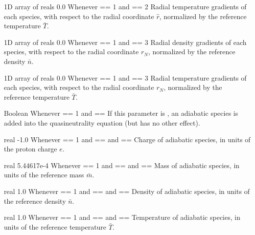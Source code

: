 \myhrule

{1D array of reals}
{0.0}
{Whenever  == 1 and  == 2}
{Radial temperature gradients of each species, with respect to the radial coordinate $\hat{r}$, normalized by the reference temperature $\bar{T}$.}

\myhrule

{1D array of reals}
{0.0}
{Whenever  == 1 and  == 3}
{Radial density gradients of each species, with respect to the radial coordinate $r_N$, normalized by the reference density $\bar{n}$.}

\myhrule

{1D array of reals}
{0.0}
{Whenever  == 1 and  == 3}
{Radial temperature gradients of each species, with respect to the radial coordinate $r_N$, normalized by the reference temperature $\bar{T}$.}

\myhrule

{Boolean}
{\false}
{Whenever  == 1 and  == \true}
{If this parameter is \true, an adiabatic species is added into the quasineutrality equation (but has no other effect).}

\myhrule

{real}
{-1.0}
{Whenever  == 1 and  == \true and  == \true}
{Charge of adiabatic species, in units of the proton charge $e$.}

\myhrule

{real}
{5.44617e-4}
{Whenever  == 1 and  == \true and  == \true}
{Mass of adiabatic species, in units of the reference mass $\bar{m}$.}

\myhrule

{real}
{1.0}
{Whenever  == 1 and  == \true and  == \true}
{Density of adiabatic species, in units of the reference density $\bar{n}$.}

\myhrule

{real}
{1.0}
{Whenever  == 1 and  == \true and  == \true}
{Temperature of adiabatic species, in units of the reference temperature $\bar{T}$.}

